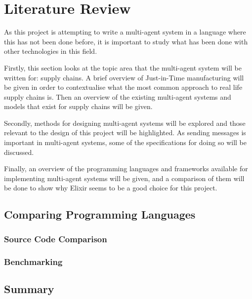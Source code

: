 \section{Literature Review}

As this project is attempting to write a multi-agent system in a language where this has not been done before, it is important to study what has been done with other technologies in this field.

Firstly, this section looks at the topic area that the multi-agent system will be written for: supply chains.
A brief overview of Just-in-Time manufacturing will be given in order to contextualise what the most common approach to real life supply chains is.
Then an overview of the existing multi-agent systems and models that exist for supply chains will be given.

Secondly, methods for designing multi-agent systems will be explored and those relevant to the design of this project will be highlighted.
As sending messages is important in multi-agent systems, some of the specifications for doing so will be discussed.

Finally, an overview of the programming languages and frameworks available for implementing multi-agent systems will be given, and a comparison of them will be done to show why Elixir seems to be a good choice for this project.







\subsection{Comparing Programming Languages}

\subsubsection{Source Code Comparison}

\subsubsection{Benchmarking}

\subsection{Summary}

